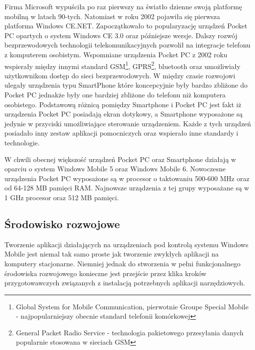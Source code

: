 Firma Microsoft wypuściła po raz pierwszy na światło dzienne swoją platformę
mobilną w latach 90-tych\cite{blog:wm-app-dev}. Natomiast w roku 2002 pojawiła
się pierwsza platforma Windows CE.NET. Zapoczątkowało to popularyzację urządzeń
Pocket PC opartych o system Windows CE 3.0 oraz późniejsze wersje. Dalszy rozwój
bezprzewodowych technologii telekomunikacyjnych pozwolił na integracje telefonu z
komputerem osobistym. Wspomniane urządzenia Pocket PC z 2002 roku wspierały
między innymi standard GSM\footnote{Global System for Mobile Communication,
pierwotnie Groupe Special Mobile - najpopularniejszy obecnie standard telefonii
komórkowej}, GPRS\footnote{General Packet Radio Service - technologia pakietowego
przesyłania danych popularnie stosowana w sieciach GSM}, bluetooth oraz
umożliwiały użytkownikom dostęp do sieci bezprzewodowych. W między czasie
rozwojowi ulegały urządzenia typu SmartPhone które koncepcyjnie były bardzo
zbliżone do Pocket PC jednakże były one bardziej zbliżone do telefonu niż
komputera osobistego. Podstawową różnicą pomiędzy Smartphone i Pocket PC jest
fakt iż urządzenia Pocket PC posiadają ekran dotykowy, a Smartphone wyposażone są
jedynie w przyciski umożliwiające sterowanie urządzeniem. Każde z tych urządzeń
posiadało inny zestaw aplikacji pomocniczych oraz wspierało inne standardy i
technologie.

W chwili obecnej większość urządzeń Pocket PC oraz Smartphone działają w oparciu
o system Windows Mobile 5 oraz Windows Mobile 6. Nowoczesne urządzenia Pocket PC
wyposażone są w procesor o taktowaniu 500-600 MHz oraz od 64-128 MB pamięci RAM.
Najnowsze urządzenia z tej grupy wyposażane są w 1 GHz procesor oraz 512 MB
pamięci.

\subsection{Środowisko rozwojowe}
Tworzenie aplikacji działających na urządzeniach pod kontrolą systemu Windows
Mobile jest niemal tak samo proste jak tworzenie zwykłych aplikacji na komputery
stacjonarne. Niemniej jednak do stworzenia w pełni funkcjonalnego środowiska
rozwojowego konieczne jest przejście przez klika kroków przygotowawczych
związanych z instalacją potrzebnych aplikacji narzędziowych.

